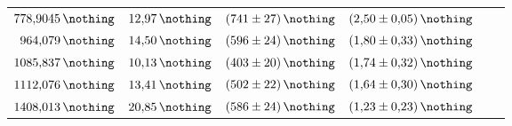 \begin{table}[h!]
\begin{tabular}{ r  r  r  r  r  r  }
                $\SI{778.9045}{\nothing}$        & $\SI{12.97}{\nothing}$& $\SI{ 741 (27)}{\nothing}$ & $\SI{ 2.50  (5)}{\nothing}$            \\ %
                $\SI{ 964.079}{\nothing}$        & $\SI{14.50}{\nothing}$& $\SI{ 596 (24)}{\nothing}$ & $\SI{ 1.80 (33)}{\nothing}$            \\ %
                $\SI{1085.837}{\nothing}$        & $\SI{10.13}{\nothing}$& $\SI{ 403 (20)}{\nothing}$ & $\SI{ 1.74 (32)}{\nothing}$            \\ %
                $\SI{1112.076}{\nothing}$        & $\SI{13.41}{\nothing}$& $\SI{ 502 (22)}{\nothing}$ & $\SI{ 1.64 (30)}{\nothing}$            \\ %
                $\SI{1408.013}{\nothing}$        & $\SI{20.85}{\nothing}$& $\SI{ 586 (24)}{\nothing}$ & $\SI{ 1.23 (23)}{\nothing}$            \\ %
    \toprule
  \end{tabular}
\end{table}
